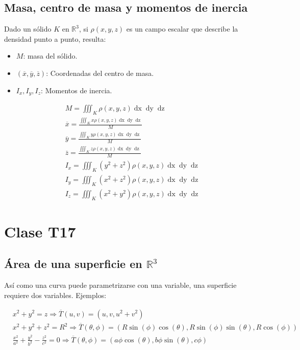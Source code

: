 \documentclass{article}
\renewcommand{\Bbb}{\mathbb}
\begin{document}
\subsection{Masa, centro de masa y momentos de inercia}

Dado un sólido $K$ en $\Bbb R^3$, si $\rho(x,y,z)$ es un campo escalar que describe la densidad punto a punto, resulta:

\begin{itemize}
\item $M$: masa del sólido.
\item $(\overline{x}, \overline{y}, \overline{z})$: Coordenadas del centro de masa.
\item $I_x, I_y, I_z$: Momentos de inercia.
\end{itemize}

\begin{align}
M = \iiint_K \rho(x,y,z) \mathop{dx} \mathop{dy} \mathop{dz} \\
\overline{x} = \frac{ \iiint_K x \rho(x,y,z) \mathop{dx} \mathop{dy} \mathop{dz} }{M} \\
\overline{y} = \frac{ \iiint_K y \rho(x,y,z) \mathop{dx} \mathop{dy} \mathop{dz} }{M} \\
\overline{z} = \frac{ \iiint_K z \rho(x,y,z) \mathop{dx} \mathop{dy} \mathop{dz} }{M} \\
I_x = \iiint_K (y^2 + z^2) \rho(x,y,z) \mathop{dx} \mathop{dy} \mathop{dz} \\
I_y = \iiint_K (x^2 + z^2) \rho(x,y,z) \mathop{dx} \mathop{dy} \mathop{dz} \\
I_z = \iiint_K (x^2 + y^2) \rho(x,y,z) \mathop{dx} \mathop{dy} \mathop{dz}
\end{align}

\section{Clase T17}

\subsection{Área de una superficie en \texorpdfstring{$\Bbb R^3$}{R3}}

Así como una curva puede parametrizarse con una variable, una superficie requiere dos variables. Ejemplos:

\begin{align}
& x^2 + y^2 = z \Rightarrow \overline{T}(u,v) = (u, v, u^2 + v^2) \\
& x^2 + y^2 + z^2 = R^2 \Rightarrow \overline{T}(\theta, \phi) = (R \sin(\phi) \cos(\theta), R \sin(\phi) \sin(\theta), R \cos(\phi)) \label{eq:supesf} \\
& \frac{x^2}{a^2} + \frac{y^2}{b^2} - \frac{z^2}{c^2} = 0 \Rightarrow \overline{T}(\theta, \phi) = (a \phi \cos(\theta), b \phi \sin(\theta), c \phi) \label{eq:supcon}
\end{align}
\end{document}
